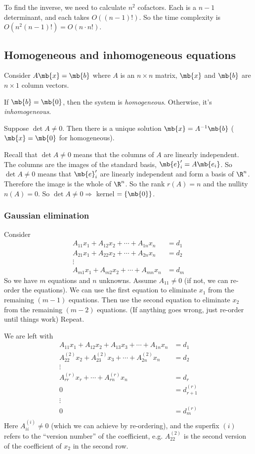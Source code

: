 \documentclass[a4paper]{article}
\begin{document}
To find the inverse, we need to calculate $n^2$ cofactors. Each is a $n -1$ determinant, and each takes $O((n - 1)!)$. So the time complexity is $O(n^2 (n - 1)!) = O(n\cdot n!)$.

\subsection{Homogeneous and inhomogeneous equations}
Consider $A\mb{x} = \mb{b}$ where $A$ is an $n\times n$ matrix, $\mb{x}$ and $\mb{b}$ are $n\times 1$ column vectors.
\begin{defi}
  If $\mb{b} = \mb{0}$, then the system is \emph{homogeneous}. Otherwise, it's \emph{inhomogeneous}.
\end{defi}

Suppose $\det A\not= 0$. Then there is a unique solution $\mb{x} = A^{-1}\mb{b}$ ($\mb{x} = \mb{0}$ for homogeneous).

\note Recall that $\det A\not= 0$ means that the columns of $A$ are linearly independent. The columns are the images of the standard basis, $\mb{e}_i' = A\mb{e_i}$. So $\det A\not = 0$ means that $\mb{e}_i'$ are linearly independent and form a basis of $\R^n$. Therefore the image is the whole of $\R^n$. So the rank $r(A) = n$ and the nullity $n(A) = 0$. So $\det A\not= 0\Rightarrow$ kernel $= \{\mb{0}\}$.

\subsubsection{Gaussian elimination}
Consider
\begin{align*}
  A_{11}x_1 + A_{12}x_2 + \cdots + A_{1n}x_n &= d_1\\
  A_{21}x_1 + A_{22}x_2 + \cdots + A_{2n}x_n &= d_2\\
  \vdots&\\
  A_{m1}x_1 + A_{m2}x_2 + \cdots + A_{mn}x_n &= d_m
\end{align*}
So we have $m$ equations and $n$ unknowns.
Assume $A_{11}\not=0$ (if not, we can re-order the equations). We can use the first equation to eliminate $x_1$ from the remaining $(m - 1)$ equations. Then use the second equation to eliminate $x_2$ from the remaining $(m - 2)$ equations. (If anything goes wrong, just re-order until things work) Repeat.

We are left with
\begin{align*}
  A_{11}x_1 + A_{12}x_2 + A_{13}x_3 + \cdots + A_{1n}x_n &= d_1\\
  A_{22}^{(2)}x_2 + A_{23}^{(2)}x_3 + \cdots + A_{2n}^{(2)}x_n &= d_2\\
  \vdots&\\
  A_{rr}^{(r)}x_r + \cdots + A_{rn}^{(r)}x_n &= d_r\\
  0 &= d_{r + 1}^{(r)}\\
  \vdots&\\
  0 &= d_{m}^{(r)}\\
\end{align*}
Here $A_{ii}^{(i)} \not=0$ (which we can achieve by re-ordering), and the superfix $(i)$ refers to the ``version number'' of the coefficient, e.g. $A_{22}^{(2)}$ is the second version of the coefficient of $x_2$ in the second row.
\end{document}
